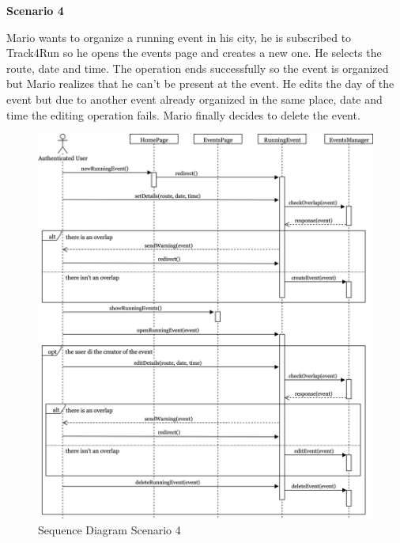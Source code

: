 \documentclass[../main.tex]{subfiles}
\begin{document}
		\begin{minipage}{\textwidth}
			{\bf Scenario 4}
			\vspace{3mm}

			Mario wants to organize a running event in his city, he is subscribed to Track4Run so he opens the events page and creates a new one. He selects the route, date and time. The operation ends successfully so the event is organized but Mario realizes that he can't be present at the event. He edits the day of the event but due to another event already organized in the same place, date and time the editing operation fails. Mario finally decides to delete the event.

			\vspace{5mm}
		\end{minipage}
		\begin{figure}[H]
			\centering
			\includegraphics[scale=.07]{images/sequenceDiagram4.png}
			\caption{Sequence Diagram Scenario 4 \label{fig:Sequence Diagram Scenario 4}}
		\end{figure}
		\begin{minipage}{\textwidth}
			 
		\end{minipage}
\end{document}
